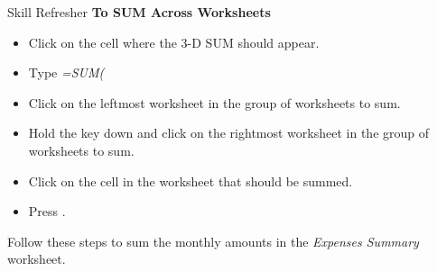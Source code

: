 \begin{center}
	\begin{sklbox}{Skill Refresher}
		\textbf{To SUM Across Worksheets}
		\\
		\begin{itemize}
			\setlength{\itemsep}{0pt}
			\setlength{\parskip}{0pt}
			\setlength{\parsep}{0pt}
			
			\item Click on the cell where the $ 3 $-D SUM should appear.
			\item Type \textit{=SUM(}
			\item Click on the leftmost worksheet in the group of worksheets to sum.
			\item Hold the  key down and click on the rightmost worksheet in the group of worksheets to sum.
			\item Click on the cell in the worksheet that should be summed.
			\item Press .
			
		\end{itemize}
	\end{sklbox}
\end{center}

Follow these steps to sum the monthly amounts in the \textit{Expenses Summary} worksheet.


